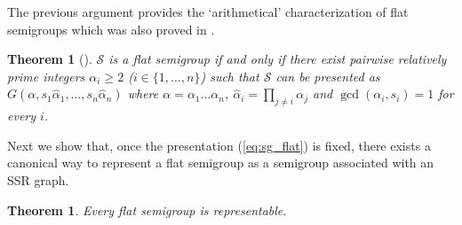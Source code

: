 \documentclass[oneside]{amsart}
\numberwithin{equation}{section}
\numberwithin{equation}{subsection}
\theoremstyle{plain}
\newtheorem{thm}[equation]{Theorem}
\theoremstyle{definition}
\newcommand{\al}{\alpha}
\newcommand{\Se}{\mathcal{S}}
\newcommand{\z}[1]{\widehat{#1}}
\begin{document}
The previous argument provides the `arithmetical' characterization of flat semigroups which was also proved in \cite{art_rch}.
\begin{thm}[\cite{art_rch}]
    $\Se$ is a flat semigroup if and only if there exist pairwise relatively prime integers $\al_i\geq 2$ ($i\in \{1,\dots,n\}$) such that $\Se$ can be presented as $G(\al,s_1\z{\al}_1,\dots,s_n\z{\al}_n)$ where $\alpha=\alpha_1\dots\al_n$, $\z{\al}_i=\prod_{j\neq i} \al_j$ and $\gcd(\al_i,s_i)=1$ for every $i$.
\end{thm} 
Next we show that, once the presentation (\ref{eq:sg_flat}) is fixed, there exists a canonical way to represent a flat semigroup as a semigroup associated with an SSR graph.
\begin{thm}
    \label{thm_flat_rep}
    Every flat semigroup is representable.
\end{thm}
\end{document}
